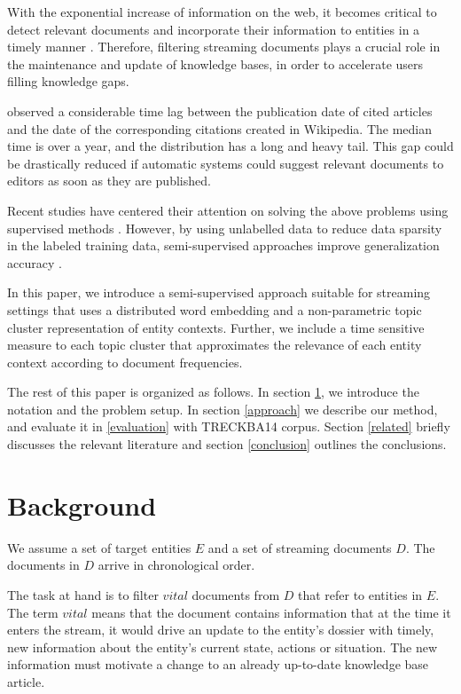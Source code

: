 \documentclass{article}
\begin{document}
With the exponential increase of information on the web, it becomes critical to detect relevant documents and incorporate their information to entities in a timely manner \cite{jingang13}. Therefore, filtering streaming documents plays a crucial role in the maintenance and update of knowledge bases, in order to accelerate users filling knowledge gaps.

\cite{frank12} observed a considerable time lag between the publication date of cited articles and the date of the corresponding citations created in Wikipedia. The median time is over a year, and the distribution has a long and heavy tail. This gap could be drastically reduced if automatic systems could suggest relevant documents to editors as soon as they are published.

Recent studies have centered their attention on solving the above problems using supervised methods \cite{xitong13, bouvier13, efron13, zhang13, bellogin13}. However, by using unlabelled data to reduce data sparsity in the labeled training data, semi-supervised approaches improve generalization accuracy \cite{Turian10wordrepresentations}. 

In this paper, we introduce a semi-supervised approach suitable for streaming settings that uses a distributed word embedding and a non-parametric topic cluster representation of entity contexts. Further, we include a time sensitive measure to each topic cluster that approximates the relevance of each entity context according to document frequencies.

The rest of this paper is organized as follows. In section \ref{background}, we introduce the notation and the problem setup. In section \ref{approach} we describe our method, and evaluate it in \ref{evaluation} with TRECKBA14 corpus. Section \ref{related} briefly discusses the relevant literature and section \ref{conclusion} outlines the conclusions.

\section{Background}
\label{background} 

We assume a set of target entities $E$ and a set of streaming documents $D$. The documents in $D$ arrive in chronological order.

The task at hand is to filter $vital$ documents from $D$ that refer to entities in $E$.
The term $vital$ means that the document contains information that at the time it enters the stream, it would drive an update to the entity's dossier with timely, new information about the entity's current state, actions or situation. The new information must motivate a change to an already up-to-date knowledge base article.
\end{document}
